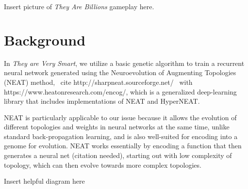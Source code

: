 \documentclass[letterpaper]{article}
\def\tavs{\textit{They are Very Smart}}
\begin{document}
Insert picture of \textit{They Are Billions} gameplay here.

\section{Background}
In \tavs, we utilize a basic genetic algorithm to train a recurrent neural network generated using the Neuroevolution of Augmenting Topologies (NEAT) method, ~cite http://sharpneat.sourceforge.net/~ with https://www.heatonresearch.com/encog/, which is a generalized deep-learning library that includes implementations of NEAT and HyperNEAT.

NEAT is particularly applicable to our issue because it allows the evolution of different topologies and weights in neural networks at the same time, unlike standard back-propagation learning, and is also well-suited for encoding into a genome for evolution. NEAT works essentially by encoding a function that then generates a neural net (citation needed), starting out with low complexity of topology, which can then evolve towards more complex topologies. 

Insert helpful diagram here
\end{document}
